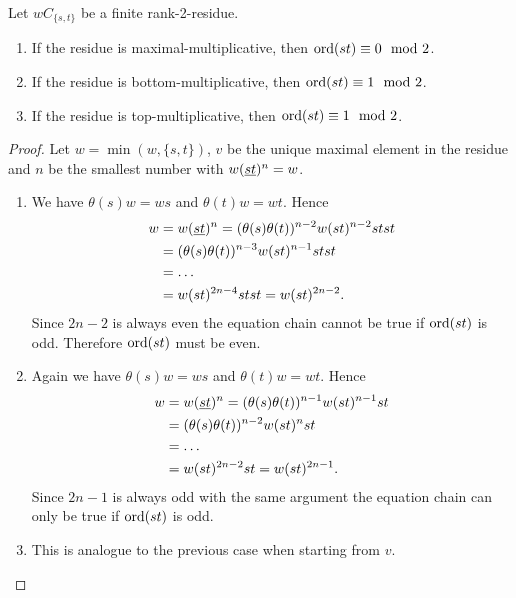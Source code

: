 \begin{lemm}
	Let $wC_{\{s,t\}}$ be a finite rank-2-residue.
	\begin{enumerate}
		\item If the residue is maximal-multiplicative, then $\operatorname{ord}(st) \equiv 0 \mod 2$.
		\item If the residue is bottom-multiplicative, then $\operatorname{ord}(st) \equiv 1 \mod 2$.
		\item If the residue is top-multiplicative, then $\operatorname{ord}(st) \equiv 1 \mod 2$. 
	\end{enumerate}

	\begin{proof}
		Let $w = \min(w, \{s,t\})$, $v$ be the unique maximal element in the residue and $n$ be the smallest number with $w(\underline{s} \underline{t})^n = w$.
		\begin{enumerate}
			\item We have $\theta(s)w = ws$ and $\theta(t)w = wt$. Hence
			\begin{align*}
				w & = w(\underline{s} \underline{t})^n = (\theta(s)\theta(t))^{n-2} w (st)^{n-2} stst \\
				  & = (\theta(s)\theta(t))^{n-3} w (st)^{n-1} stst \\
				  & = \ldots \\
				  & = w (st)^{2n-4} stst = w (st)^{2n-2}.
			\end{align*}
			Since $2n-2$ is always even the equation chain cannot be true if $\operatorname{ord}(st)$ is odd. Therefore $\operatorname{ord}(st)$ must be even.
			\item Again we have $\theta(s)w = ws$ and $\theta(t)w = wt$. Hence
			\begin{align*}
				w & = w(\underline{s} \underline{t})^n = (\theta(s)\theta(t))^{n-1} w (st)^{n-1} st \\
				  & = (\theta(s)\theta(t))^{n-2} w (st)^{n} st \\
				  & = \ldots \\
				  & = w (st)^{2n-2} st = w (st)^{2n-1}.
			\end{align*}
			Since $2n-1$ is always odd with the same argument the equation chain can only be true if $\operatorname{ord}(st)$ is odd.
			\item This is analogue to the previous case when starting from $v$. \qedhere
		\end{enumerate}
	\end{proof}
\end{lemm}

